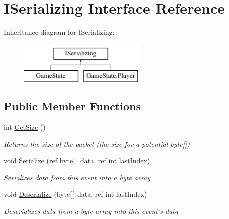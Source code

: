 \hypertarget{interface_i_serializing}{\section{I\-Serializing Interface Reference}
\label{interface_i_serializing}
}
Inheritance diagram for I\-Serializing\-:\begin{figure}[H]
\begin{center}
\leavevmode
\includegraphics[height=2.000000cm]{interface_i_serializing}
\end{center}
\end{figure}
\subsection*{Public Member Functions}
\begin{DoxyCompactItemize}
\item 
int \hyperlink{interface_i_serializing_a9e6ea0afaeac8d1d57e20579f87bebe2}{Get\-Size} ()
\begin{DoxyCompactList}\small\item\em Returns the size of the packet (the size for a potential byte\mbox{[}\mbox{]}) \end{DoxyCompactList}\item 
void \hyperlink{interface_i_serializing_ac31a44c2358a197e774fa3f79cc80356}{Serialize} (ref byte\mbox{[}$\,$\mbox{]} data, ref int last\-Index)
\begin{DoxyCompactList}\small\item\em Serializes data from this event into a byte array \end{DoxyCompactList}\item 
void \hyperlink{interface_i_serializing_a92f8ba3a06d21e7b01e37411e4e3145c}{Deserialize} (byte\mbox{[}$\,$\mbox{]} data, ref int last\-Index)
\begin{DoxyCompactList}\small\item\em Deserializes data from a byte array into this event's data \end{DoxyCompactList}\end{DoxyCompactItemize}



